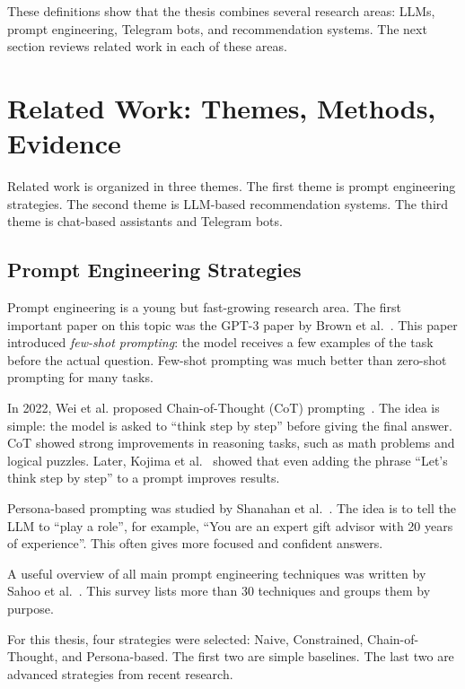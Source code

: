 These definitions show that the thesis combines several research areas: LLMs, prompt engineering, Telegram bots, and recommendation systems. The next section reviews related work in each of these areas.

\section{Related Work: Themes, Methods, Evidence}
\label{sec:related-work}

Related work is organized in three themes. The first theme is prompt engineering strategies. The second theme is LLM-based recommendation systems. The third theme is chat-based assistants and Telegram bots.

\subsection{Prompt Engineering Strategies}

Prompt engineering is a young but fast-growing research area. The first important paper on this topic was the GPT-3 paper by Brown et al.~\cite{brown2020language}. This paper introduced \textit{few-shot prompting}: the model receives a few examples of the task before the actual question. Few-shot prompting was much better than zero-shot prompting for many tasks.

In 2022, Wei et al. proposed Chain-of-Thought (CoT) prompting~\cite{wei2022chain}. The idea is simple: the model is asked to ``think step by step'' before giving the final answer. CoT showed strong improvements in reasoning tasks, such as math problems and logical puzzles. Later, Kojima et al.~\cite{kojima2022large} showed that even adding the phrase ``Let's think step by step'' to a prompt improves results.

Persona-based prompting was studied by Shanahan et al.~\cite{shanahan2023role}. The idea is to tell the LLM to ``play a role'', for example, ``You are an expert gift advisor with 20 years of experience''. This often gives more focused and confident answers.

A useful overview of all main prompt engineering techniques was written by Sahoo et al.~\cite{sahoo2024systematic}. This survey lists more than 30 techniques and groups them by purpose.

For this thesis, four strategies were selected: Naive, Constrained, Chain-of-Thought, and Persona-based. The first two are simple baselines. The last two are advanced strategies from recent research.

